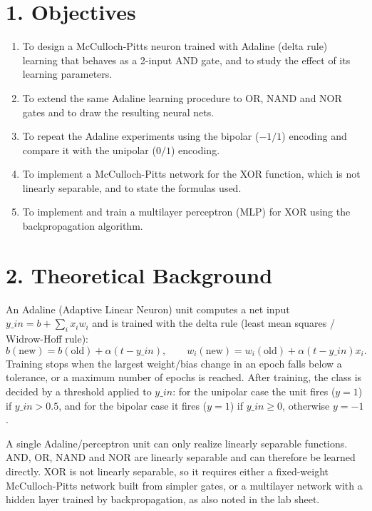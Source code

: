 \documentclass[12pt,a4paper]{article}
\begin{document}
\section*{1. Objectives}

\begin{enumerate}[leftmargin=1.6em]
  \item To design a McCulloch-Pitts neuron trained with Adaline (delta rule) learning that behaves as a 2-input AND gate, and to study the effect of its learning parameters.
  \item To extend the same Adaline learning procedure to OR, NAND and NOR gates and to draw the resulting neural nets.
  \item To repeat the Adaline experiments using the bipolar ($-1/1$) encoding and compare it with the unipolar ($0/1$) encoding.
  \item To implement a McCulloch-Pitts network for the XOR function, which is not linearly separable, and to state the formulas used.
  \item To implement and train a multilayer perceptron (MLP) for XOR using the backpropagation algorithm.
\end{enumerate}

\section*{2. Theoretical Background}

An Adaline (Adaptive Linear Neuron) unit computes a net input $y\_in = b + \sum_i x_i w_i$ and is trained with the delta rule (least mean squares / Widrow-Hoff rule):
\[
  b(\text{new}) = b(\text{old}) + \alpha(t - y\_in), \qquad
  w_i(\text{new}) = w_i(\text{old}) + \alpha(t - y\_in)x_i .
\]
Training stops when the largest weight/bias change in an epoch falls below a tolerance, or a maximum number of epochs is reached. After training, the class is decided by a threshold applied to $y\_in$: for the unipolar case the unit fires ($y=1$) if $y\_in > 0.5$, and for the bipolar case it fires ($y=1$) if $y\_in \geq 0$, otherwise $y=-1$.

A single Adaline/perceptron unit can only realize linearly separable functions. AND, OR, NAND and NOR are linearly separable and can therefore be learned directly. XOR is not linearly separable, so it requires either a fixed-weight McCulloch-Pitts network built from simpler gates, or a multilayer network with a hidden layer trained by backpropagation, as also noted in the lab sheet.
\end{document}
